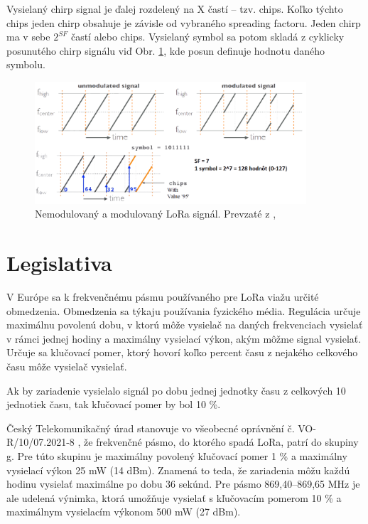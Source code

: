 \documentclass[slovak,master]{diploma}
\begin{document}
Vysielaný chirp signal je ďalej rozdelený na X častí -- tzv. chips. Koľko týchto chips jeden chirp obsahuje je závisle od vybraného spreading factoru. 
Jeden chirp ma v sebe $2^{SF}$ častí alebo chips. Vysielaný symbol sa potom skladá z cyklicky posunutého chirp signálu viď 
Obr. \ref{fig:loraModulation}, kde posun definuje hodnotu daného symbolu.
\begin{figure}
	\centering
	\includegraphics[width=0.9\textwidth]{Figures/loraModulation.png}
	\caption{Nemodulovaný a modulovaný LoRa signál. Prevzaté z \cite{loraMod}, \cite{loraMod2}}
	\label{fig:loraModulation}
\end{figure}

\section{Legislativa}
V Európe sa k frekvenčnému pásmu používaného pre LoRa viažu určité obmedzenia. 
Obmedzenia sa týkaju používania fyzického média. Regulácia určuje maximálnu povolenú dobu, v ktorú môže vysielač na daných frekvenciach vysielať 
v rámci jednej hodiny a maximálny vysielací výkon, akým môžme signal vysielať.
Určuje sa klučovací pomer, ktorý hovorí koľko percent času z nejakého celkového času môže vysielač vysielať.

Ak by zariadenie vysielalo signál po dobu jednej jednotky času z celkových 10 jednotiek času, tak kľučovací pomer by bol 10 \%.

Český Telekomunikačný úrad \cite{ctu} stanovuje vo všeobecné oprávnění č. VO-R/10/07.2021-8 \cite{vor}, že 
frekvenčné pásmo, do ktorého spadá LoRa, patrí do skupiny g. Pre túto skupinu je maximálny povolený kľučovací pomer 1 \% a maximálny 
vysielací výkon 25 mW (14 dBm). Znamená to teda, že zariadenia môžu každú hodinu vysielať maximálne po dobu 36 sekúnd.
Pre pásmo 869,40--869,65 MHz je ale udelená výnimka, ktorá umožňuje vysielať s kľučovacím pomerom 10 \% a maximálnym vysielacím výkonom 500 mW (27 dBm).
\end{document}
